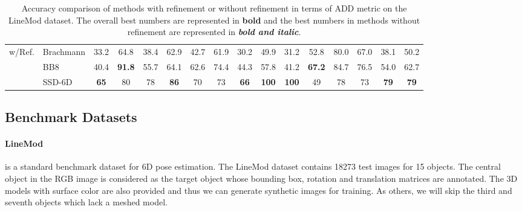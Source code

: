 \documentclass[10pt,twocolumn,letterpaper]{article}
\begin{document}
\begin{table*}[t]
{\begin{tabular}{ll|c|c|c|c|c|c|c|c|c|c|c|c|c|c}
\multicolumn{1}{l|}{\multirow{3}{*}{w/Ref.}} & Brachmann \cite{7780735}& 33.2                     & 64.8                           & 38.4                     & 62.9                     & 42.7                     & 61.9                         & 30.2                      & 49.9                        & 31.2                      & 52.8                             & 80.0                      & 67.0                      & 38.1                       & 50.2                        \\
\multicolumn{1}{l|}{}                         & BB8 \cite{Rad2017BB8AS}       & 40.4                     & \textbf{91.8}                           & 55.7                     & 64.1                     & 62.6                     & 74.4                         & 44.3                      & 57.8                        & 41.2                      & \textbf{67.2}                             & 84.7                      & 76.5                      & 54.0                       & 62.7                        \\
\multicolumn{1}{l|}{}                         & SSD-6D \cite{Kehl2017SSD6DMR}    & \textbf{65}                       & 80                             & 78                       & \textbf{86}                       & 70                       & 73                           & \textbf{66}                        & \textbf{100}                         & \textbf{100}                       & 49                               & 78    & 73 & \textbf{79}                         & \textbf{79}
\end{tabular}}
\caption{Accuracy comparison of methods with refinement or without refinement in terms of ADD metric on the LineMod dataset. The overall best numbers are represented in \textbf{bold} and the best numbers in methods without refinement are represented in \textbf{\textit{bold and italic}}.}
\label{tb:ADD}
\end{table*}
\subsection{Benchmark Datasets}
\paragraph{LineMod \cite{Hinterstoisser:2012:MBT:2481913.2481959}} is a standard benchmark dataset for 6D pose estimation. The LineMod dataset contains 18273 test images for 15 objects. The central object in the RGB image is considered as the target object whose bounding box, rotation and translation matrices are annotated. The 3D models with surface color are also provided and thus we can generate synthetic images for training. As others, we will skip the third and seventh objects which lack a meshed model.
\end{document}
